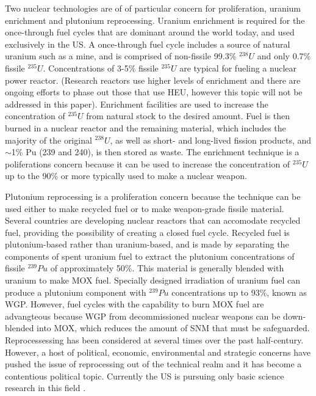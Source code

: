 Two nuclear technologies are of of particular concern for proliferation, uranium enrichment and plutonium reprocessing.  Uranium enrichment is required for the once-through fuel cycles that are dominant around the world today, and used exclusively in the \gls{US}.  A once-through fuel cycle includes a source of natural uranium such as a mine, and is comprised of non-fissile 99.3\% $^{238}U$ and only 0.7\% fissile $^{235}U$. Concentrations of 3-5\% fissile $^{235}U$ are typical for fueling a nuclear power reactor.  (Research reactors use higher levels of enrichment and there are ongoing efforts to phase out those that use \gls{HEU}, however this topic will not be addressed in this paper).  Enrichment facilities are used to increase the concentration of $^{235}U$ from natural stock to the desired amount.  Fuel is then burned in a nuclear reactor and the remaining material, which includes the majority of the original $^{238}U$, as well as short- and long-lived fission products, and $\sim$1\% Pu (239 and 240), is then stored as waste.  The enrichment technique is a poliferations concern because it can be used to increase the concentration of $^{235}U$ up to the 90\% or more typically used to make a nuclear weapon\cite{_military_2014}.

Plutonium reprocessing is a proliferation concern because the technique can be used either to make recycled fuel or to make weapon-grade fissile material.  Several countries are developing nuclear reactors that can accomodate recycled fuel, providing the possibility of creating a closed fuel cycle\cite{_processing_2015}.  Recycled fuel is plutonium-based rather than uranium-based, and is made by separating the components of spent uranium fuel to extract the plutonium concentrations of fissile $^{239}Pu$ of approximately 50\%.  This material is generally  blended with uranium to make \gls{MOX} fuel.  Specially designed irradiation of uranium fuel can produce a plutonium component with $^{239}Pu$ concentrations up to 93\%, known as \gls{WGP}. However, fuel cycles with the capability to burn \gls{MOX} fuel are advangteous because \gls{WGP} from decommissioned nuclear weapons can be down-blended into \gls{MOX}, which reduces the amount of \gls{SNM} that must be safeguarded.  Reprocessessing has been considered at several times over the past half-century.  However, a host of political, economic, environmental and strategic concerns have pushed the issue of reprocessing out of the technical realm and it has become a contentious political topic\cite{rossin_policy_????}.  Currently the \gls{US} is pursuing only basic science research in this field \cite{editorial_adieu_2009}.

